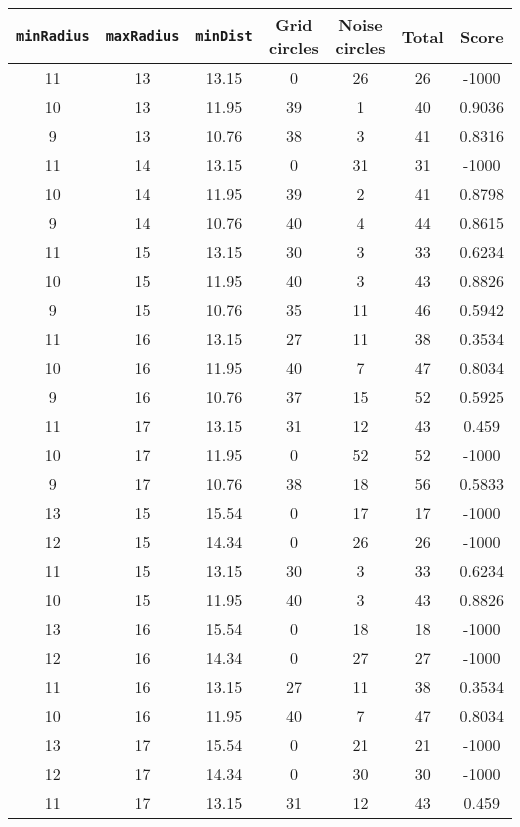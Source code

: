 \documentclass[letterpaper, 12pt]{article}
\begin{document}
\begin{longtable}{|c|c|c|c|c|c|c|}
\hline
\textbf{\texttt{minRadius}} & \textbf{\texttt{maxRadius}} & \textbf{\texttt{minDist}} & \textbf{Grid circles} & \textbf{Noise circles} & \textbf{Total} & \textbf{Score} \\
\hline
11 & 13 & 13.15 & 0 & 26 & 26 & -1000 \\
\hline
10 & 13 & 11.95 & 39 & 1 & 40 & 0.9036 \\
\hline
9 & 13 & 10.76 & 38 & 3 & 41 & 0.8316 \\
\hline
11 & 14 & 13.15 & 0 & 31 & 31 & -1000 \\
\hline
10 & 14 & 11.95 & 39 & 2 & 41 & 0.8798 \\
\hline
9 & 14 & 10.76 & 40 & 4 & 44 & 0.8615 \\
\hline
11 & 15 & 13.15 & 30 & 3 & 33 & 0.6234 \\
\hline
10 & 15 & 11.95 & 40 & 3 & 43 & 0.8826 \\
\hline
9 & 15 & 10.76 & 35 & 11 & 46 & 0.5942 \\
\hline
11 & 16 & 13.15 & 27 & 11 & 38 & 0.3534 \\
\hline
10 & 16 & 11.95 & 40 & 7 & 47 & 0.8034 \\
\hline
9 & 16 & 10.76 & 37 & 15 & 52 & 0.5925 \\
\hline
11 & 17 & 13.15 & 31 & 12 & 43 & 0.459 \\
\hline
10 & 17 & 11.95 & 0 & 52 & 52 & -1000 \\
\hline
9 & 17 & 10.76 & 38 & 18 & 56 & 0.5833 \\
\hline
13 & 15 & 15.54 & 0 & 17 & 17 & -1000 \\
\hline
12 & 15 & 14.34 & 0 & 26 & 26 & -1000 \\
\hline
11 & 15 & 13.15 & 30 & 3 & 33 & 0.6234 \\
\hline
10 & 15 & 11.95 & 40 & 3 & 43 & 0.8826 \\
\hline
13 & 16 & 15.54 & 0 & 18 & 18 & -1000 \\
\hline
12 & 16 & 14.34 & 0 & 27 & 27 & -1000 \\
\hline
11 & 16 & 13.15 & 27 & 11 & 38 & 0.3534 \\
\hline
10 & 16 & 11.95 & 40 & 7 & 47 & 0.8034 \\
\hline
13 & 17 & 15.54 & 0 & 21 & 21 & -1000 \\
\hline
12 & 17 & 14.34 & 0 & 30 & 30 & -1000 \\
\hline
11 & 17 & 13.15 & 31 & 12 & 43 & 0.459 \\
\hline

\end{longtable}
\end{document}
